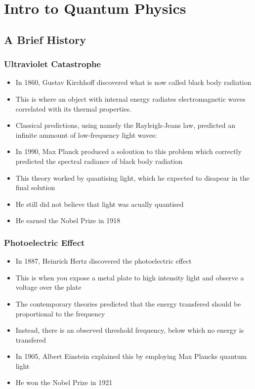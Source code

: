 \documentclass{article}
\begin{document}
\newpage
\section{Intro to Quantum Physics}
\subsection{A Brief History}

\subsubsection*{Ultraviolet Catastrophe}

\begin{itemize}
    \item In 1860, Gustav Kirchhoff discovered what is now called black body radiation
    \item This is where an object with internal energy radiates electromagnetic waves correlated with its thermal properties.
    \item Classical predictions, using namely the Rayleigh-Jeans law, predicted an infinite ammount of low-frequency light waves:
    \item In 1990, Max Planck produced a soloution to this problem which correctly predicted the spectral radiance of black body radiation
    \item This theory worked by quantising light, which he expected to disapear in the final solution
    \item He still did not believe that light was acually quantised
    \item He earned the Nobel Prize in 1918 
\end{itemize}

\subsubsection*{Photoelectric Effect}

\begin{itemize}
    \item In 1887, Heinrich Hertz discovered the photoelectric effect
    \item This is when you expose a metal plate to high intensity light and observe a voltage over the plate
    \item The contemporary theories predicted that the energy transfered should be proportional to the frequency
    \item Instead, there is an observed threshold frequency, below which no energy is transfered
    \item In 1905, Albert Einstein explained this by employing Max Plancks quantum light
    \item He won the Nobel Prize in 1921
\end{itemize}
\end{document}
